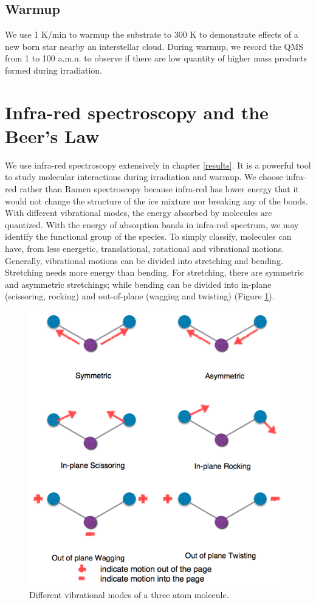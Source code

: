 \subsection{Warmup}
We use 1 K/min to warmup the substrate to 300 K to demonstrate effects of a new born star nearby an interstellar cloud. During warmup, we record the QMS from 1 to 100 a.m.u. to observe if there are low quantity of higher mass products formed during irradiation.

\section{Infra-red spectroscopy and the Beer’s Law}
\label{sec:spectroscopy}
We use infra-red spectroscopy extensively in chapter \ref{results}. It is a powerful tool to study molecular interactions during irradiation and warmup. We choose infra-red rather than Ramen spectroscopy because infra-red has lower energy that it would not change the structure of the ice mixture nor breaking any of the bonds. With different vibrational modes, the energy absorbed by molecules are quantized. With the energy of absorption bands in infra-red spectrum, we may identify the functional group of the species. To simply classify, molecules can have, from less energetic, translational, rotational and vibrational motions. Generally, vibrational motions can be divided into stretching and bending. Stretching needs more energy than bending. For stretching, there are symmetric and asymmetric stretchings; while bending can be divided into in-plane (scissoring, rocking) and out-of-plane (wagging and twisting) (Figure \ref{fig:vibration}).
\begin{figure}
\centering
\includegraphics[width=\textwidth]{figures/chapter2/vibration.png}
\caption{Different vibrational modes of a three atom molecule.}
\label{fig:vibration}
\end{figure}

